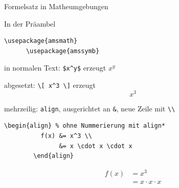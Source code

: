 \begin{Frame}[fragile]{Formelsatz in Matheumgebungen}
  \begin{Block}{In der Präambel}
    \begin{lstlisting}[gobble=6,style=block]
      \usepackage{amsmath}
      \usepackage{amssymb}
    \end{lstlisting}
  \end{Block}
  
  \begin{looseitemize}
    \item in normalen Text: \lstinline-$x^y$- erzeugt $x^y$
    \item abgesetzt: \lstinline-\[ x^3 \]- erzeugt
      \[ x^3 \]
    \item mehrzeilig: \lstinline-align-, ausgerichtet an \lstinline-&-, neue Zeile mit \lstinline-\\- 
      \begin{lstlisting}[gobble=8]
        \begin{align} % ohne Nummerierung mit align*
          f(x) &= x^3 \\
               &= x \cdot x \cdot x
        \end{align}
      \end{lstlisting}
      \begin{align}
        f(x) &= x^3 \\
             &= x \cdot x \cdot x
      \end{align}
  \end{looseitemize}
\end{Frame}

